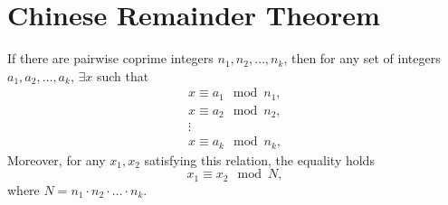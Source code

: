\section{Chinese Remainder Theorem}

\begin{theorem}
\label{thm:chineseremainder}
If there are pairwise coprime integers $n_1, n_2, \dots, n_k$, then
for any set of integers $a_1, a_2, \dots, a_k$, $\exists x$ such
that 
\begin{eqnarray}
x \equiv a_1 \mod n_1,
\nonumber \\
x \equiv a_2 \mod n_2,
\nonumber \\
\vdots \nonumber \\
x \equiv a_k \mod n_k,
\end{eqnarray}
Moreover, for any $x_1, x_2$ satisfying this relation, the equality holds
\[
x_1 \equiv x_2 \mod N,
\]
where $N = n_1 \cdot n_2 \cdot \dots \cdot n_k$.
\end{theorem}